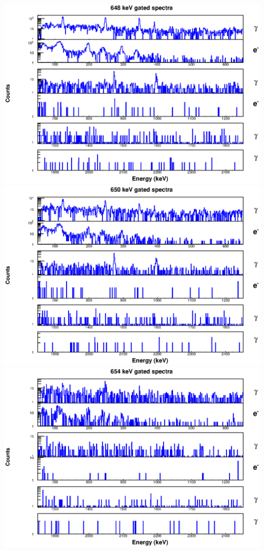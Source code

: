 \includegraphics[scale=0.8]{154Gd_Appendix/648_combined.eps}
\includegraphics[scale=0.8]{154Gd_Appendix/650_combined.eps}
\includegraphics[scale=0.8]{154Gd_Appendix/654_combined.eps}
